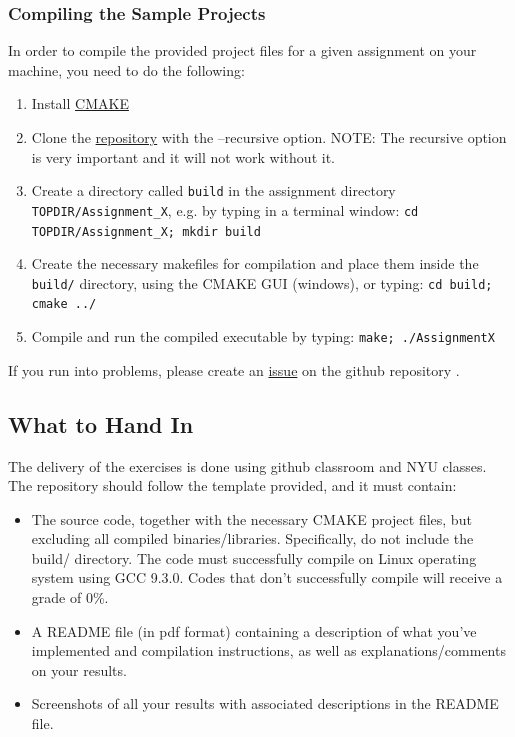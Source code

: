 \documentclass[11pt]{report}
\begin{document}
\subsubsection*{Compiling the Sample Projects}
In order to compile the provided project files for a given assignment on your machine, you need to do the following:
  \begin{enumerate}
\item{Install \href{http://www.cmake.org/download/}{CMAKE}}
\item{Clone the \href{https://github.com/danielepanozzo/cg}{repository} with the --recursive option. NOTE: The recursive option is very important and it will not work without it. }
\item{Create a directory called \texttt{build} in the assignment directory \texttt{TOPDIR/Assignment\_X}, e.g. by typing in a terminal window:
\texttt{cd TOPDIR/Assignment\_X; mkdir build}
}
\item{
Create the necessary makefiles for compilation and place them inside the \texttt{build/} directory, using the CMAKE GUI (windows), or typing:
\texttt{cd build; cmake ../}
}
\item{Compile and run the compiled executable by typing:
\texttt{make; ./AssignmentX}
}
\end{enumerate}

If you run into problems, please create an \href{https://github.com/jccosta/CS-GY-6533/issues}{issue} on the github repository .

\subsection*{What to Hand In}
The delivery of the exercises is done using github classroom and NYU classes. The repository should follow the template provided, and it must contain:
\begin{itemize}
\item{The source code, together with the necessary CMAKE project files, but excluding all compiled binaries/libraries. Specifically, do not include the build/ directory. The code must successfully compile on Linux operating system using GCC 9.3.0. Codes that don't successfully compile will receive a grade of 0\%.}
\item{A README file (in pdf format) containing a description of what you've implemented and compilation
instructions, as well as explanations/comments on your results.}
\item{Screenshots of all your results with associated descriptions in the README file.}
\end{itemize}
\end{document}
